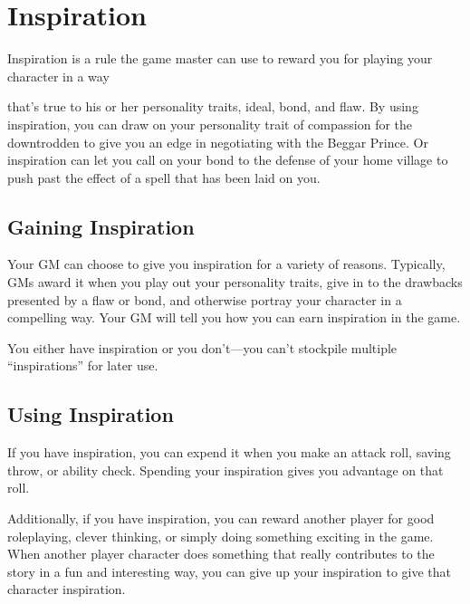 \documentclass[
]{article}
\date{}
\begin{document}
\hypertarget{inspiration}{%
\section{Inspiration}\label{inspiration}}

Inspiration is a rule the game master can use to reward you for playing
your character in a way

that's true to his or her personality traits, ideal, bond, and flaw. By
using inspiration, you can draw on your personality trait of compassion
for the downtrodden to give you an edge in negotiating with the Beggar
Prince. Or inspiration can let you call on your bond to the defense of
your home village to push past the effect of a spell that has been laid
on you.

\hypertarget{gaining-inspiration}{%
\subsection{Gaining Inspiration}\label{gaining-inspiration}}

Your GM can choose to give you inspiration for a variety of reasons.
Typically, GMs award it when you play out your personality traits, give
in to the drawbacks presented by a flaw or bond, and otherwise portray
your character in a compelling way. Your GM will tell you how you can
earn inspiration in the game.

You either have inspiration or you don't---you can't stockpile multiple
``inspirations'' for later use.

\hypertarget{using-inspiration}{%
\subsection{Using Inspiration}\label{using-inspiration}}

If you have inspiration, you can expend it when you make an attack roll,
saving throw, or ability check. Spending your inspiration gives you
advantage on that roll.

Additionally, if you have inspiration, you can reward another player for
good roleplaying, clever thinking, or simply doing something exciting in
the game. When another player character does something that really
contributes to the story in a fun and interesting way, you can give up
your inspiration to give that character inspiration.
\end{document}
